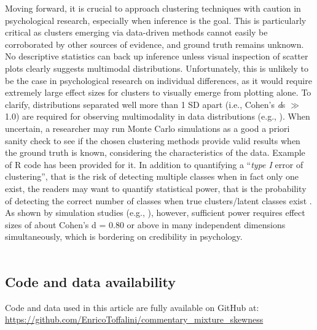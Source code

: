 \documentclass[letterpaper,11pt]{article}
\begin{document}
Moving forward, it is crucial to approach clustering techniques with caution in psychological research, especially when inference is the goal. This is particularly critical as clusters emerging via data-driven methods cannot easily be corroborated by other sources of evidence, and ground truth remains unknown. No descriptive statistics can back up inference unless visual inspection of scatter plots clearly suggests multimodal distributions. Unfortunately, this is unlikely to be the case in psychological research on individual differences, as it would require extremely large effect sizes for clusters to visually emerge from plotting alone. To clarify, distributions separated well more than 1 SD apart (i.e., Cohen’s \textit{d}s $\gg$ 1.0) are required for observing multimodality in data distributions (e.g., ). When uncertain, a researcher may run Monte Carlo simulations as a good a priori sanity check to see if the chosen clustering methods provide valid results when the ground truth is known, considering the characteristics of the data. Example of R code has been provided for it. In addition to quantifying a “\textit{type I} error of clustering”, that is the risk of detecting multiple classes when in fact only one exist, the readers may want to quantify statistical power, that is the probability of detecting the correct number of classes when true clusters/latent classes exist \cite{tein2013statistical}. As shown by simulation studies (e.g., ), however, sufficient power requires effect sizes of about Cohen’s d = 0.80 or above in many independent dimensions simultaneously, which is bordering on credibility in psychology.
\\
\\
\subsection*{Code and data availability }
Code and data used in this article are fully available on GitHub at: \url{https://github.com/EnricoToffalini/commentary_mixture_skewness}
\newpage


\end{document}
